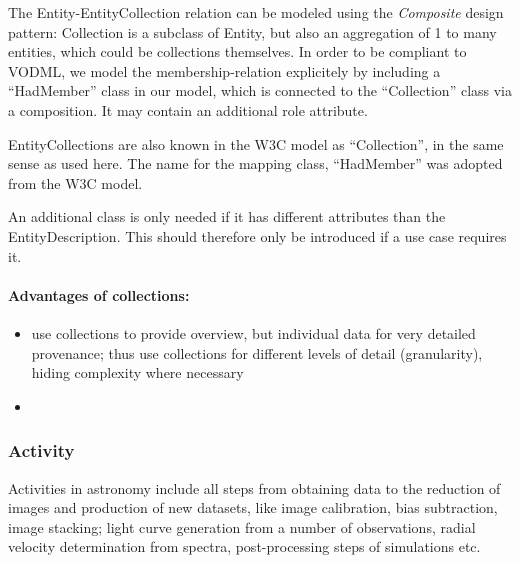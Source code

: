 
The Entity-EntityCollection relation can be modeled using the \emph{Composite} design pattern: 
Collection is a subclass of Entity, but also an aggregation of 1 to many entities, 
which could be collections themselves. 
In order to be compliant to VODML, we model the membership-relation explicitely 
by including a ``HadMember'' class in our model, which is connected to the
``Collection'' class via a composition. It may contain an additional role attribute.

EntityCollections are also known in the W3C model as ``Collection'', in the same sense as used here. 
The name for the mapping class, ``HadMember'' was adopted from the W3C model.

An additional class  is only 
needed if it has different attributes than 
the EntityDescription. This should therefore only be introduced if a use case requires it.

\paragraph{Advantages of collections:}
\begin{itemize}
\item use collections to provide overview, but individual data for very detailed provenance; 
	  thus use collections for different levels of detail (granularity), hiding 
	  complexity where necessary
\item {}
\end{itemize}







\subsubsection{Activity}
Activities in astronomy include all steps from obtaining data to the reduction of 
images and production of new datasets, like image calibration, bias subtraction, image stacking; 
light curve generation from a number of observations, radial velocity 
determination from spectra, post-processing steps of simulations etc.


